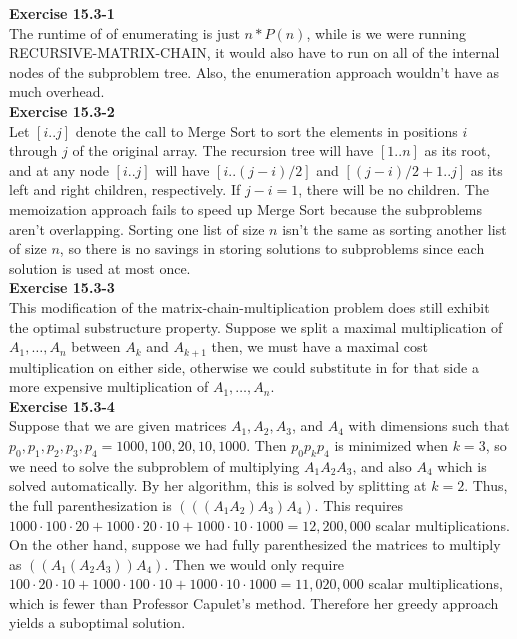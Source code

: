 \documentclass{article}
\begin{document}
\noindent\textbf{Exercise 15.3-1}\\

The runtime of of enumerating is just $n*P(n)$, while is we were running RECURSIVE-MATRIX-CHAIN, it would also have to run on all of the internal nodes of the subproblem tree. Also, the enumeration approach wouldn't have as much overhead.\\

\noindent\textbf{Exercise 15.3-2}\\

Let $[i..j]$ denote the call to Merge Sort to sort the elements in positions $i$ through $j$ of the original array. The recursion tree will have $[1..n]$ as its root, and at any node $[i..j]$ will have $[i..(j-i)/2]$ and $[(j-i)/2 + 1..j]$ as its left and right children, respectively.  If $j-i = 1$, there will be no children.  The memoization approach fails to speed up Merge Sort because the subproblems aren't overlapping.  Sorting one list of size $n$ isn't the same as sorting another list of size $n$, so there is no savings in storing solutions to subproblems since each solution is used at most once.\\

\noindent\textbf{Exercise 15.3-3}\\

This modification of the matrix-chain-multiplication problem does still exhibit the optimal substructure property. Suppose we split a maximal multiplication of $A_1, \ldots,A_n$ between $A_k$ and $A_{k+1}$ then, we must have a maximal cost multiplication on either side, otherwise we could substitute in for that side a more expensive multiplication of $A_1,\ldots,A_n$.\\

\noindent\textbf{Exercise 15.3-4}\\

Suppose that we are given matrices $A_1, A_2, A_3$, and $A_4$ with dimensions such that $p_0,p_1,p_2,p_3,p_4 = 1000,100,20,10,1000$.  Then $p_0 p_k p_4$ is minimized when $k=3$, so we need to solve the subproblem of multiplying $A_1A_2A_3$, and also $A_4$ which is solved automatically.  By her algorithm, this is solved by splitting at $k=2$.  Thus, the full parenthesization is $(((A_1 A_2)A_3)A_4)$.  This requires $1000\cdot 100 \cdot 20 + 1000 \cdot 20 \cdot 10 + 1000 \cdot 10 \cdot 1000 = 12,200,000$ scalar multiplications. On the other hand, suppose we had fully parenthesized the matrices to multiply as $((A_1 (A_2A_3))A_4)$.  Then we would only require $100\cdot 20 \cdot 10 + 1000 \cdot 100 \cdot 10 + 1000 \cdot 10 \cdot 1000= 11,020,000$ scalar multiplications, which is fewer than Professor Capulet's method.  Therefore her greedy approach yields a suboptimal solution. \\
\end{document}
